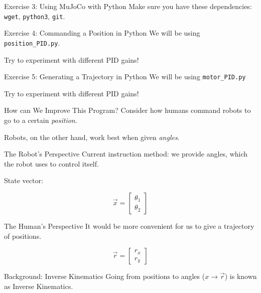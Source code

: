 \documentclass[14pt]{beamer}
\begin{document}
	\begin{frame}{Exercise 3: Using MuJoCo with Python}
		Make sure you have these dependencies: \texttt{wget}, \texttt{python3}, \texttt{git}.
	\end{frame}
	
	\begin{frame}{Exercise 4: Commanding a Position in Python}
		We will be using \texttt{position\_PID.py}.
		
		\vspace{1cm}
		
		Try to experiment with different PID gains!
	\end{frame}
	
	\begin{frame}{Exercise 5: Generating a Trajectory in Python}
		We will be using \texttt{motor\_PID.py}
		
		\vspace{1cm}
		
		Try to experiment with different PID gains!
	\end{frame}
	
	\begin{frame}{How can We Improve This Program?}
		Consider how humans command robots to go to a certain \emph{position}.
		
		\vspace{1cm}
		
		Robots, on the other hand, work best when given \emph{angles}.
	\end{frame}
	
	\begin{frame}{The Robot's Perspective}
		Current instruction method: we provide angles, which the robot uses to control itself.
		
		\vspace{1cm}
		
		State vector:
		
		$$\vec{x} = \begin{bmatrix}\theta_1 \\ \theta_2\end{bmatrix}$$
	\end{frame}
	
	\begin{frame}{The Human's Perspective}
		It would be more convenient for us to give a trajectory of positions.
		
		$$\vec{r}=\begin{bmatrix}r_x \\ r_y \end{bmatrix}$$
	\end{frame}
	
	\begin{frame}{Background: Inverse Kinematics}
		Going from positions to angles ($x \to\vec{r}$) is known as Inverse Kinematics.
	\end{frame}
\end{document}

